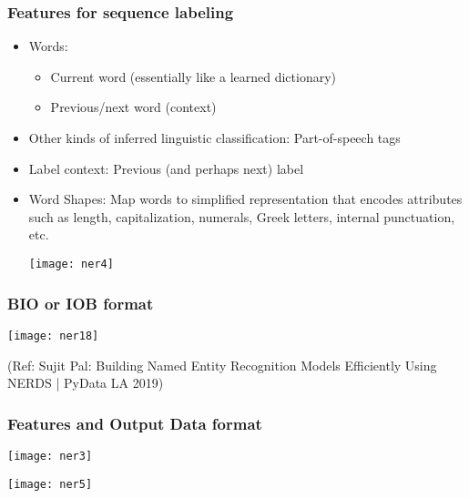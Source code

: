 \begin{frame}[fragile]\frametitle{Features for sequence labeling}
  \begin{itemize}
  \item Words:
  \begin{itemize}
  \item Current word (essentially like a learned dictionary)
  \item Previous/next word (context)
  \end{itemize}
  \item Other kinds of inferred linguistic classification: Part-of-speech tags
  \item Label context: Previous (and perhaps next) label
  \item Word Shapes: Map words to simplified representation that encodes attributes such as length, capitalization, numerals, Greek letters, internal punctuation, etc.
\begin{center}
\texttt{[image: ner4]}
\end{center}
  \end{itemize}
\end{frame}

\begin{frame}[fragile]\frametitle{BIO or IOB format}

\begin{center}
\texttt{[image: ner18]}
\end{center}

{\tiny (Ref: Sujit Pal: Building Named Entity Recognition Models Efficiently Using NERDS | PyData LA 2019)}

\end{frame}

\begin{frame}[fragile]\frametitle{Features and Output Data format}

\begin{center}
\texttt{[image: ner3]}

\texttt{[image: ner5]}
\end{center}
\end{frame}

